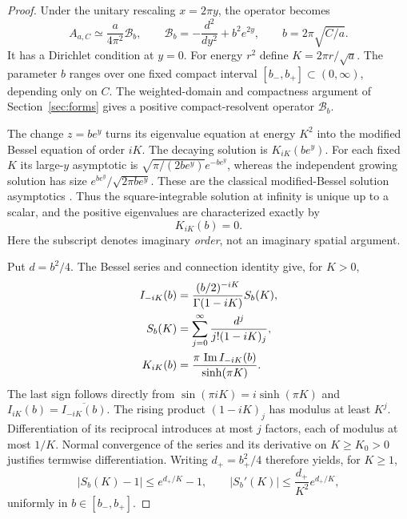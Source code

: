 \begin{proof}
Under the unitary rescaling $x=2\pi y$, the operator becomes
\begin{equation}
A_{a,C}\simeq\frac{a}{4\pi^2}\mathcal B_b,
\qquad
\mathcal B_b=-\frac{d^2}{dy^2}+b^2e^{2y},
\qquad
b=2\pi\sqrt{C/a}.
\label{eq:bessel-scale}
\end{equation}
It has a Dirichlet condition at $y=0$.
For energy $r^2$ define $K=2\pi r/\sqrt a$.
The parameter $b$ ranges over one fixed compact interval
$[b_-,b_+]\subset(0,\infty)$, depending only on $C$.
The weighted-domain and compactness argument of
Section~\ref{sec:forms} gives a positive compact-resolvent
operator $\mathcal B_b$.

The change $z=be^y$ turns its eigenvalue equation at energy
$K^2$ into the modified Bessel equation of order $iK$.
The decaying solution is $K_{iK}(be^y)$.
For each fixed $K$ its large-$y$ asymptotic is
$\sqrt{\pi/(2be^y)}e^{-be^y}$, whereas the independent
growing solution has size
$e^{be^y}/\sqrt{2\pi be^y}$.
These are the classical modified-Bessel solution asymptotics
\citep[10.25.3 and 10.40.1]{nist2026dlmf}.
Thus the square-integrable solution at infinity is unique up
to a scalar, and the positive eigenvalues are characterized
exactly by
\[
K_{iK}(b)=0.
\]
Here the subscript denotes imaginary \emph{order}, not an
imaginary spatial argument.

Put $d=b^2/4$.
The Bessel series and connection identity
\citep[10.25.2 and 10.27.4]{nist2026dlmf} give, for $K>0$,
\begin{align}
I_{-iK}(b)
 &=\frac{(b/2)^{-iK}}{\Gamma(1-iK)}S_b(K),\notag\\
S_b(K)
 &=\sum_{j=0}^\infty\frac{d^j}{j!(1-iK)_j},\notag\\
K_{iK}(b)
 &=\frac{\pi\,\operatorname{Im} I_{-iK}(b)}{\sinh(\pi K)}.
\label{eq:bessel-series}
\end{align}
The last sign follows directly from
$\sin(\pi iK)=i\sinh(\pi K)$ and
$I_{iK}(b)=\overline{I_{-iK}(b)}$.
The rising product $(1-iK)_j$ has modulus at least $K^j$.
Differentiation of its reciprocal introduces at most $j$
factors, each of modulus at most $1/K$.
Normal convergence of the series and its derivative on
$K\ge K_0>0$ justifies termwise differentiation.
Writing $d_+=b_+^2/4$ therefore yields, for $K\ge1$,
\begin{equation}
|S_b(K)-1|\le e^{d_+/K}-1,\qquad
|S_b'(K)|\le \frac{d_+}{K^2}e^{d_+/K},
\label{eq:uniform-series}
\end{equation}
uniformly in $b\in[b_-,b_+]$.


\end{proof}
